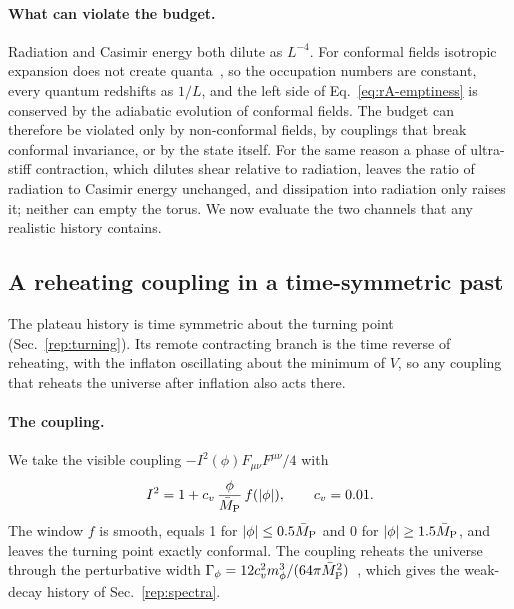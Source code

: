 \paragraph{What can violate the budget.}
Radiation and Casimir energy both dilute as $L^{-4}$.
For conformal fields isotropic expansion does not create quanta~\cite{Parker:1969au}, so the occupation numbers are constant, every quantum redshifts as $1/L$, and the left side of Eq.~\eqref{eq:rA-emptiness} is conserved by the adiabatic evolution of conformal fields.
The budget can therefore be violated only by non-conformal fields, by couplings that break conformal invariance, or by the state itself.
For the same reason a phase of ultra-stiff contraction, which dilutes shear relative to radiation, leaves the ratio of radiation to Casimir energy unchanged, and dissipation into radiation only raises it; neither can empty the torus.
We now evaluate the two channels that any realistic history contains.

\subsection{A reheating coupling in a time-symmetric past}
\label{rA:g-reheating}

The plateau history is time symmetric about the turning point (Sec.~\ref{rep:turning}).
Its remote contracting branch is the time reverse of reheating, with the inflaton oscillating about the minimum of $V$, so any coupling that reheats the universe after inflation also acts there.

\paragraph{The coupling.}
We take the visible coupling $-I^2(\phi)F_{\mu\nu}F^{\mu\nu}/4$ with
\begin{equation}
I^2=1+c_v\,\frac{\phi}{\MPbar}\,f(|\phi|),\qquad c_v=0.01 . %
\end{equation}
The window $f$ is smooth, equals 1 for $|\phi|\leq0.5\bar M_{\mathrm{P}}$ and 0 for $|\phi|\geq1.5\bar M_{\mathrm{P}}$, and leaves the turning point exactly conformal. %
The coupling reheats the universe through the perturbative width $\Gamma_\phi=12c_v^2m_\phi^3/(64\pi\bar M_{\mathrm{P}}^2)$~\cite{Garcia:2023obw}, which gives the weak-decay history of Sec.~\ref{rep:spectra}.

